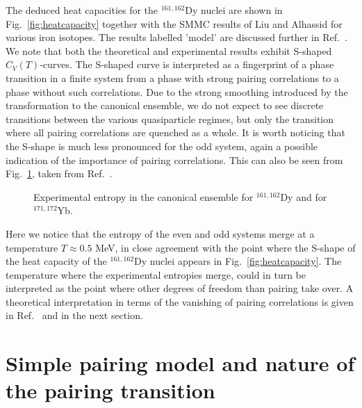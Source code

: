 \documentclass{elsart}
\begin{document}
The deduced heat capacities for the $^{161,162}$Dy nuclei 
are shown in Fig.~\ref{fig:heatcapacity} together with the SMMC
results of Liu and Alhassid \cite{Al99} for various iron isotopes.
The results labelled 'model' are discussed further in Ref.\ 
\cite{andreas2000}. We note that both the theoretical and 
experimental results exhibit 
S-shaped $C_V(T)$-curves.
The S-shaped curve is interpreted as a 
fingerprint of a phase transition in a finite system from a phase with strong 
pairing correlations to a phase without such correlations. Due to the strong 
smoothing introduced by the transformation to the canonical ensemble, we do not
expect to see discrete transitions between the various quasiparticle regimes, 
but only the transition where all pairing correlations are quenched as a whole.
It is worth noticing that the S-shape is much less 
pronounced for the odd system,
again a possible indication of the importance of pairing correlations. 
This can also be seen from Fig.\ \ref{fig:entropy}, taken from Ref.\
\cite{andreas2000}.
\begin{figure}
\begin{center}
          {\epsfxsize=20pc }
          \caption{Experimental entropy in the canonical ensemble for $^{161,162}$Dy and
for $^{171,172}$Yb. \label{fig:entropy}}
\end{center}
\end{figure}
Here we notice that the entropy of the even and odd systems merge
at a temperature $T\approx 0.5$ MeV, in close agreement with the point where
the S-shape of the heat capacity of 
the $^{161,162}$Dy nuclei appears  
in Fig.~\ref{fig:heatcapacity}. The temperature where 
the experimental entropies merge,
could in turn be interpreted as the point where other degrees of freedom
than pairing take over. A theoretical interpretation
in terms of the vanishing of pairing correlations is given 
in Ref.\ \cite{andreas2000} and in the next section.




\section{Simple pairing model and nature of the pairing transition}
\label{sec:sec4}
\end{document}
